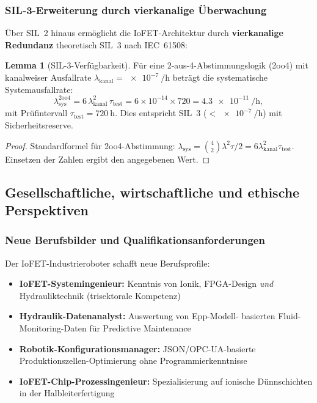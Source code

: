 ﻿\documentclass[a4paper,12pt]{scrreprt}
\theoremstyle{definition}
\newtheorem{lemma}{Lemma}[section]
\begin{document}
\subsubsection{SIL-3-Erweiterung durch vierkanalige Überwachung}

Über SIL~2 hinaus ermöglicht die IoFET-Architektur durch
\textbf{vierkanalige Redundanz} theoretisch SIL~3 nach IEC~61508:

\begin{lemma}[SIL-3-Verfügbarkeit]
\label{lem:sil3}
Für eine 2-aus-4-Abstimmungslogik (2oo4) mit kanalweiser
Ausfallrate $\lambda_{\text{kanal}} = \SI{e-7}{\per\hour}$
beträgt die systematische Systemausfallrate:
\begin{equation}
  \lambda_{\text{sys}}^{\text{2oo4}}
  = 6 \,\lambda_{\text{kanal}}^2 \,\tau_{\text{test}}
  = 6 \times 10^{-14} \times 720
  = \SI{4.3e-11}{\per\hour},
\end{equation}
mit Prüfintervall $\tau_{\text{test}} = \SI{720}{\hour}$.
Dies entspricht SIL~3 ($< \SI{e-7}{\per\hour}$) mit Sicherheitsreserve.
\end{lemma}

\begin{proof}
Standardformel für 2oo4-Abstimmung: $\lambda_{\text{sys}} =
\binom{4}{2} \lambda^2 \tau / 2 =
6 \lambda_{\text{kanal}}^2 \tau_{\text{test}}$.
Einsetzen der Zahlen ergibt den angegebenen Wert.
\end{proof}

\subsection{Gesellschaftliche, wirtschaftliche und ethische Perspektiven}

\subsubsection{Neue Berufsbilder und Qualifikationsanforderungen}

Der IoFET-Industrieroboter schafft neue Berufsprofile:

\begin{itemize}
  \item \textbf{IoFET-Systemingenieur:} Kenntnis von Ionik,
        FPGA-Design \emph{und} Hydrauliktechnik (trisektorale Kompetenz)
  \item \textbf{Hydraulik-Datenanalyst:} Auswertung von Epp-Modell-
        basierten Fluid-Monitoring-Daten für Predictive Maintenance
  \item \textbf{Robotik-Konfigurations\-manager:} JSON/OPC-UA-basierte
        Produktionszellen-Optimierung ohne Programmierkenntnisse
  \item \textbf{IoFET-Chip-Prozess\-ingenieur:} Spezialisierung auf
        ionische Dünnschichten in der Halbleiterfertigung
\end{itemize}
\end{document}
